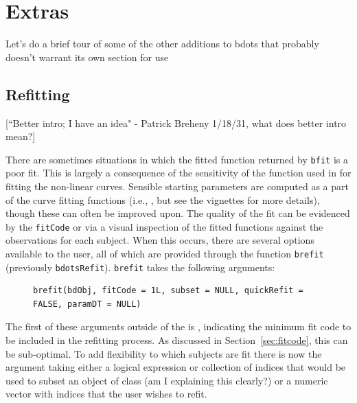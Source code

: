 \section{Extras}

Let's do a brief tour of some of the other additions to bdots that probably doesn't warrant its own section for use




\subsection{Refitting}

[``Better intro; I have an idea" - Patrick Breheny 1/18/31, what does better intro mean?]

There are sometimes situations in which the fitted function returned by \texttt{bfit} is a poor fit. This is largely a consequence of the sensitivity of the  function used in  for fitting the non-linear curves. Sensible starting parameters are computed as a part of the curve fitting functions (i.e., , but see the vignettes for more details), though these can often be improved upon. The quality of the fit can be evidenced by the \texttt{fitCode} or via a visual inspection of the fitted functions against the observations for each subject.  When this occurs, there are several options available to the user, all of which are provided through the function \texttt{brefit} (previously \texttt{bdotsRefit}). \texttt{brefit} takes the following arguments:

\begin{singlespace}
\begin{figure}[H]
\centering
\begin{BVerbatim}
brefit(bdObj, fitCode = 1L, subset = NULL, quickRefit = FALSE, paramDT = NULL)
\end{BVerbatim}
\end{figure}
\end{singlespace}

The first of these arguments outside of the  is , indicating the minimum fit code to be included in the refitting process. As discussed in Section~\ref{sec:fitcode}, this can be sub-optimal. To add flexibility to which subjects are fit there is now the  argument taking either a logical expression or collection of indices that would be used to subset an object of class  (am I explaining this clearly?) or a numeric vector with indices that the user wishes to refit.


